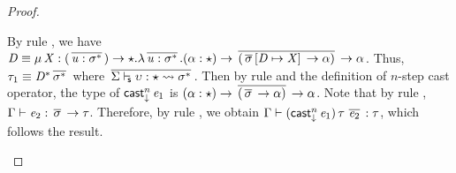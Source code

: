 \begin{proof}
\begin{description}
        By rule , we have $\mathit{D}  \equiv  \mu \, \mathit{X}  :  (  \,\overline{  \mathit{u}  :  \sigma  ^{*}  }\,  )  \rightarrow  \star  .  \lambda  \,\overline{  \mathit{u}  :  \sigma  ^{*}  }\,  .  (  \alpha  :  \star  )  \rightarrow  \,\overline{  (  \,\overline{  \sigma  }\,  [  \mathit{D}  \mapsto  \mathit{X}  ] \,  \rightarrow  \alpha  )  }\,  \rightarrow  \alpha$. Thus, $\tau_{{\mathrm{1}}}  \equiv  \mathit{D}  ^{*} \,\overline{  \sigma  ^{*}  }\,$ where $\,\overline{   \Sigma  \vdash_{\!\!\mathsf{s} }  \upsilon  :  \star   \rightsquigarrow   \sigma  ^{*}   }\,$. Then by rule  and the definition of $n$-step cast operator, the type of $\mathsf{cast}_{\downarrow}^n \, \mathit{e_{{\mathrm{1}}}}$ is $(  \alpha  :  \star  )  \rightarrow  \,\overline{  (  \,\overline{  \sigma  }\,  \rightarrow  \alpha  )  }\,  \rightarrow  \alpha$. Note that by rule , $\Gamma  \vdash  \mathit{e_{{\mathrm{2}}}}  :  \,\overline{  \sigma  }\,  \rightarrow  \tau$. Therefore, by rule , we obtain $\Gamma  \vdash  (  \mathsf{cast}_{\downarrow}^n \, \mathit{e_{{\mathrm{1}}}}  ) \, \tau \, \,\overline{  \mathit{e_{{\mathrm{2}}}}  }\,  :  \tau$, which follows the result.
    \end{description}
\end{proof}


